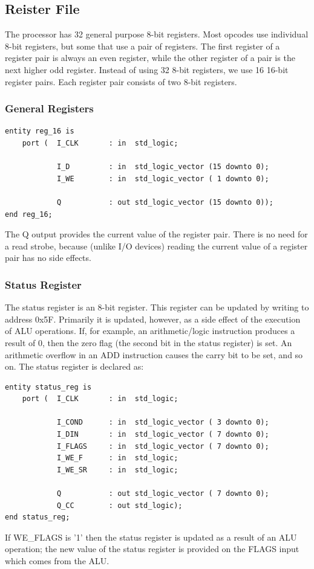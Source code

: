 \documentclass[12pt,a4paper]{report}
\begin{document}
\subsection{Reister File}
The processor has 32 general purpose 8-bit registers. Most opcodes use individual 8-bit registers, but some that use a pair of registers. The first register of a register pair is always an even register, while the other register of a pair is the next higher odd register. Instead of using 32 8-bit registers, we use 16 16-bit register pairs. Each register pair consists of two 8-bit registers.
\subsubsection{General Registers}
\begin{lstlisting}
entity reg_16 is
    port (  I_CLK       : in  std_logic;

            I_D         : in  std_logic_vector (15 downto 0);
            I_WE        : in  std_logic_vector ( 1 downto 0);

            Q           : out std_logic_vector (15 downto 0));
end reg_16;
\end{lstlisting}
The Q output provides the current value of the register pair. There is no need for a read strobe, because (unlike I/O devices) reading the current value of a register pair has no side effects.
\subsubsection{Status Register}
The status register is an 8-bit register. This register can be updated by writing to address 0x5F. Primarily it is updated, however, as a side effect of the execution of ALU operations. If, for example, an arithmetic/logic instruction produces a result of 0, then the zero flag (the second bit in the status register) is set. An arithmetic overflow in an ADD instruction causes the carry bit to be set, and so on. The status register is declared as:
\begin{lstlisting}
entity status_reg is
    port (  I_CLK       : in  std_logic;

            I_COND      : in  std_logic_vector ( 3 downto 0);
            I_DIN       : in  std_logic_vector ( 7 downto 0);
            I_FLAGS     : in  std_logic_vector ( 7 downto 0);
            I_WE_F      : in  std_logic;
            I_WE_SR     : in  std_logic;

            Q           : out std_logic_vector ( 7 downto 0);
            Q_CC        : out std_logic);
end status_reg;
\end{lstlisting}
If WE\_FLAGS is '1' then the status register is updated as a result of an ALU operation; the new value of the status register is provided on the FLAGS input which comes from the ALU.
\end{document}
